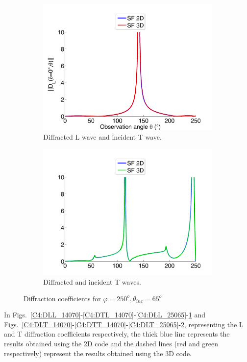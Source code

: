 \begin{figure}[h]
\begin{subfigure}[b]{0.49\textwidth}
        \includegraphics[width=\textwidth]{images/chapter4/XpropL_250_65_0_TH.png}
        \caption{Diffracted L wave and incident T wave.}
        \label{C4:DTL_25065}
    \end{subfigure}
    \begin{subfigure}[b]{0.49\textwidth}
        \includegraphics[width=\textwidth]{images/chapter4/XpropTH_250_65_0_TH.png}
        \caption{Diffracted and incident T waves.}
        \label{C4:DTT_25065}
     \end{subfigure}
     \caption{Diffraction coefficients for $\varphi=250^o, \theta_{inc}=65^o$}
     \label{C4:25065}
\end{figure}

In Figs.~\ref{C4:DLL_14070}-\ref{C4:DTL_14070}-\ref{C4:DLL_25065}-\ref{C4:DTL_25065} and Figs.~\ref{C4:DLT_14070}-\ref{C4:DTT_14070}-\ref{C4:DLT_25065}-\ref{C4:DTT_25065}, representing the L and T diffraction coefficients respectively, the thick blue line represents the results obtained using the 2D code and the dashed lines (red and green respectively) represent the results obtained using the 3D code.

